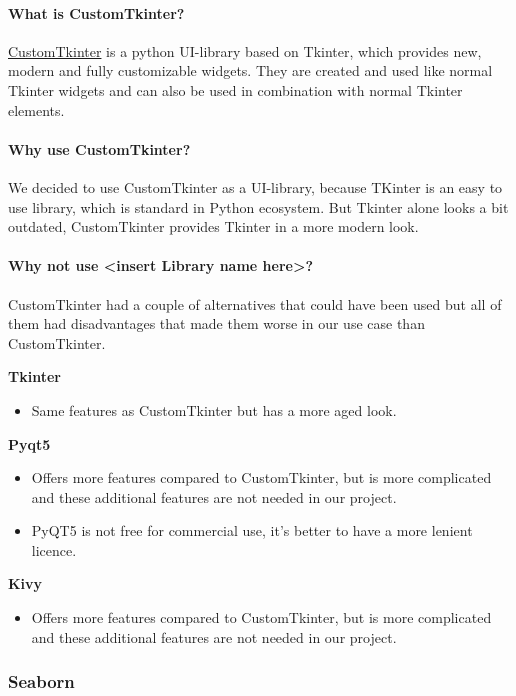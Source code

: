 \documentclass[parskip=full]{scrartcl} %
\begin{document}
\paragraph{What is CustomTkinter?}
\href{https://github.com/TomSchimansky/CustomTkinter}{CustomTkinter} is a python UI-library based on Tkinter, which provides new, modern and fully customizable widgets. They are created and used like normal Tkinter widgets and can also be used in combination with normal Tkinter elements. 

\paragraph{Why use CustomTkinter?}
We decided to use CustomTkinter as a UI-library, because TKinter is an easy to use library, which is standard in Python ecosystem.
But Tkinter alone looks a bit outdated, CustomTkinter provides Tkinter in a more modern look.

\paragraph{Why not use <insert Library name here>?}
CustomTkinter had a couple of alternatives that could have been used but all of them had disadvantages that made them worse in our use case than CustomTkinter. 
  
\textbf{Tkinter}
\begin{itemize}
    \item Same features as CustomTkinter but has a more aged look.
\end{itemize}
  
\textbf{Pyqt5}
\begin{itemize}
    \item Offers more features compared to CustomTkinter, but is more complicated and these additional features are not needed in our project.
    \item PyQT5 is not free for commercial use, it's better to have a more lenient licence.
\end{itemize}
\textbf{Kivy}
\begin{itemize}
    \item Offers more features compared to CustomTkinter, but is more complicated and these additional features are not needed in our project. 
\end{itemize}

\newpage

\subsubsection{Seaborn}
\end{document}
